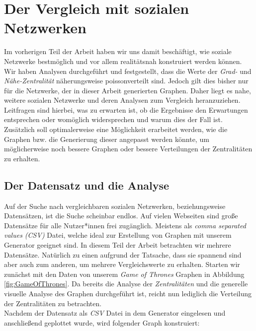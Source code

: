 \chapter{Der Vergleich mit sozialen Netzwerken}\label{ch:vergleich}

Im vorherigen Teil der Arbeit haben wir uns damit beschäftigt, wie soziale Netzwerke bestmöglich und vor allem realitätsnah konstruiert werden können. Wir haben Analysen durchgeführt und festgestellt, dass die Werte der \textit{Grad-} und \textit{Nähe-Zentralität} näherungsweise poissonverteilt sind. Jedoch gilt dies bisher nur für die Netzwerke, der in dieser Arbeit generierten Graphen. Daher liegt es nahe, weitere sozialen Netzwerke und deren Analysen zum Vergleich heranzuziehen. Leitfragen sind hierbei, was zu erwarten ist, ob die Ergebnisse den Erwartungen entsprechen oder womöglich widersprechen und warum dies der Fall ist. Zusätzlich soll optimalerweise eine Möglichkeit erarbeitet werden, wie die Graphen bzw. die Generierung dieser angepasst werden könnte, um möglicherweise noch bessere Graphen oder bessere Verteilungen der Zentralitäten zu erhalten. 

\section{Der Datensatz und die Analyse}
Auf der Suche nach vergleichbaren sozialen Netzwerken, beziehungsweise Datensätzen, ist die Suche scheinbar endlos. Auf vielen Webseiten sind große Datensätze für alle Nutzer*innen frei zugänglich. Meistens als \textit{comma separated values (CSV)} Datei, welche ideal zur Erstellung von Graphen mit unserem Generator geeignet sind. In diesem Teil der Arbeit betrachten wir mehrere Datensätze. Natürlich zu einen aufgrund der Tatsache, dass sie spannend sind aber auch zum anderen, um mehrere Vergleichswerte zu erhalten. Starten wir zunächst mit den Daten \cite{GOT} von unserem \textit{Game of Thrones} Graphen in Abbildung \ref{fig:GameOfThrones}. Da bereits die Analyse der \textit{Zentralitäten} und die generelle visuelle Analyse des Graphen durchgeführt ist, reicht nun lediglich die Verteilung der Zentralitäten zu betrachten.\\
Nachdem der Datensatz als \textit{CSV} Datei in dem Generator eingelesen und anschließend geplottet wurde, wird folgender Graph konstruiert:


